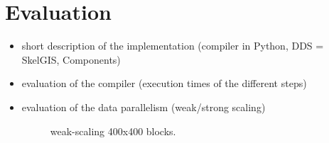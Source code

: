 \documentclass[twocolumn]{svjour3}          %
\begin{document}
\section{Evaluation}
\label{sect:eval}
\begin{itemize}
\item short description of the implementation (compiler in Python, DDS = SkelGIS, Components)
\item evaluation of the compiler (execution times of the different steps)
\item evaluation of the data parallelism (weak/strong scaling)

\begin{figure}[!h]\begin{center}
  \caption{weak-scaling 400x400 blocks.}
  \label{fig:mesh}
\end{center}\end{figure}


\end{itemize}
\end{document}
